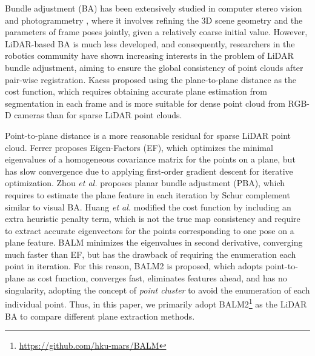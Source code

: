 \documentclass[letterpaper, 10 pt, conference]{ieeeconf}  %
\begin{document}

Bundle adjustment (BA) has been extensively studied in computer stereo vision and photogrammetry \cite{mur2015orb, qin2018vins}, where it involves refining the 3D scene geometry and the parameters of frame poses jointly, given a relatively coarse initial value. However, LiDAR-based BA is much less developed, and consequently, researchers in the robotics community have shown increasing interests in the problem of LiDAR bundle adjustment, aiming to ensure the global consistency of point clouds after pair-wise registration. Kaess \cite{kaess2015simultaneous} proposed using the plane-to-plane distance as the cost function, which requires obtaining accurate plane estimation from segmentation in each frame and is more suitable for dense point cloud from RGB-D cameras than for sparse LiDAR point clouds.

Point-to-plane distance is a more reasonable residual for sparse LiDAR point cloud. Ferrer \cite{ferrer2019eigen} proposes Eigen-Factors (EF), which optimizes the minimal eigenvalues of a homogeneous covariance matrix for the points on a plane, but has slow convergence due to applying first-order gradient descent for iterative optimization. Zhou \textit{et al.} \cite{zhou2020efficient} proposes planar bundle adjustment (PBA), 
{which requires to estimate the plane feature in each iteration by Schur complement similar to visual BA.} Huang \textit{et al.} \cite{huang2021bundle} modified the cost function by including an extra heuristic penalty term, which is not the true map consistency and require to extract accurate eigenvectors for the points corresponding to one pose on a plane feature. BALM \cite{liu2021balm} minimizes the eigenvalues in second derivative, converging much faster than EF, but has the drawback of requiring the enumeration each point in iteration. For this reason, BALM2 \cite{liu2022efficient} is proposed, which adopts point-to-plane as cost function, converges fast, eliminates features ahead, and has no singularity, adopting the concept of \textit{point cluster} to avoid the enumeration of each individual point. Thus, in this paper, we primarily adopt BALM2\footnote{\url{https://github.com/hku-mars/BALM}} as the LiDAR BA to compare different plane extraction methods.
\end{document}
